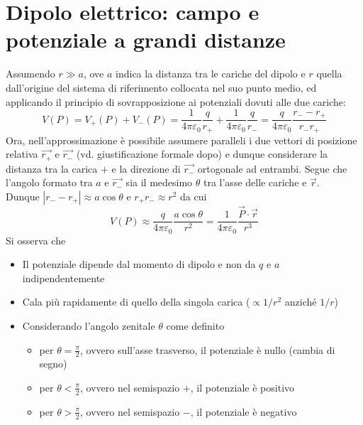 \section{Dipolo elettrico: campo e potenziale a grandi distanze}
Assumendo $r \gg a$, ove $a$ indica la distanza tra le cariche del dipolo e $r$ quella dall'origine del sistema di riferimento collocata nel suo punto medio, ed applicando il principio di sovrapposizione ai potenziali dovuti alle due cariche:
\[V(P) = V_+(P) + V_-(P) = \frac{1}{4 \pi \varepsilon_0} \frac{q}{r_+} + \frac{1}{4 \pi \varepsilon_0} \frac{q}{r_-} = \frac{q}{4 \pi \varepsilon_0} \frac{r_- - r_+}{r_- r_+}\]
Ora, nell'approssimazione è possibile assumere paralleli i due vettori di posizione relativa $\vec{r_+}$ e $\vec{r_-}$ (vd. giustificazione formale dopo) e dunque considerare la distanza tra la carica $+$ e la direzione di $\vec{r_-}$ ortogonale ad entrambi. Segue che l'angolo formato tra $a$ e $\vec{r_-}$ sia il medesimo $\theta$ tra l'asse delle cariche e $\vec{r}$. 
\\Dunque $|r_- - r_+| \approx a \cos \theta$ e $r_+ r_- \approx r^2$ da cui
\[V(P) \approx \frac{q}{4 \pi \varepsilon_0} \frac{a \cos \theta}{r^2} = \frac{1}{4 \pi \varepsilon_0} \frac{\vec{P} \cdot \vec{r}}{r^3}\]
Si osserva che 
\begin{itemize}
\item Il potenziale dipende dal momento di dipolo e non da $q$ e $a$ indipendentemente
\item Cala più rapidamente di quello della singola carica ($\propto 1/r^2$ anziché $1/r$)
\item Considerando l'angolo zenitale $\theta$ come definito
\begin{itemize}
\item per $\theta = \frac{\pi}{2}$, ovvero sull'asse trasverso, il potenziale è nullo (cambia di segno)
\item per $\theta < \frac{\pi}{2}$, ovvero nel semispazio $+$, il potenziale è positivo
\item per $\theta > \frac{\pi}{2}$, ovvero nel semispazio $-$, il potenziale è negativo
\end{itemize}
\end{itemize}

